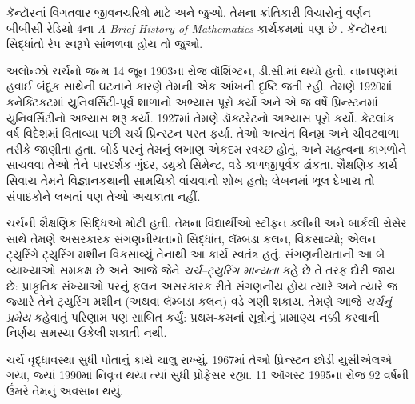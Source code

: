 \begin{reading}
કૅન્ટૉરનાં વિગતવાર જીવનચરિત્રો માટે
\citet{Dauben1990} અને
\citet{Grattan-Guinness1971} જુઓ. તેમના
ક્રાંતિકારી વિચારોનું વર્ણન બીબીસી રેડિયો 4ના
\emph{A Brief History of
  Mathematics} કાર્યક્રમમાં પણ છે
\citep{Sautoy2014}. કૅન્ટૉરના સિદ્ધાંતો
રેપ સ્વરૂપે સાંભળવા હોય તો \citet{Rose2012} જુઓ.
\end{reading}
\endgroup


\begingroup
\makeatletter{}\makeatother


\label{guunit:OLP-0623}



અલોન્ઝો ચર્ચનો જન્મ 14 જૂન 1903ના રોજ
વૉશિંગ્ટન, ડી.સી.માં થયો હતો. નાનપણમાં
હવાઈ બંદૂક સાથેની ઘટનાને કારણે તેમની
એક આંખની દૃષ્ટિ જતી રહી. તેમણે 1920માં
કનેક્ટિકટમાં યુનિવર્સિટી-પૂર્વ શાળાનો અભ્યાસ પૂરો
કર્યો અને એ જ વર્ષે પ્રિન્સ્ટનમાં
યુનિવર્સિટીનો અભ્યાસ શરૂ કર્યો. 1927માં
તેમણે ડૉક્ટરેટનો અભ્યાસ પૂરો કર્યો.
કેટલાંક વર્ષ વિદેશમાં વિતાવ્યા પછી ચર્ચ
પ્રિન્સ્ટન પરત ફર્યા. તેઓ અત્યંત વિનમ્ર
અને ચીવટવાળા તરીકે જાણીતા હતા. બોર્ડ
પરનું તેમનું લખાણ એકદમ સ્વચ્છ હોતું,
અને મહત્વના કાગળોને સાચવવા તેઓ તેને
પારદર્શક ગુંદર, ડ્યુકો સિમેન્ટ, વડે
કાળજીપૂર્વક ઢાંકતા. શૈક્ષણિક કાર્ય
સિવાય તેમને વિજ્ઞાનકથાની સામયિકો
વાંચવાનો શોખ હતો; લેખનમાં ભૂલ દેખાય
તો સંપાદકોને લખતાં પણ તેઓ અચકાતા નહીં.

ચર્ચની શૈક્ષણિક સિદ્ધિઓ મોટી હતી.
તેમના વિદ્યાર્થીઓ સ્ટીફન ક્લીની અને
બાર્કલી રોસેર સાથે તેમણે અસરકારક
સંગણનીયતાનો સિદ્ધાંત, લૅમ્બડા કલન,
વિકસાવ્યો; એલન ટ્યુરિંગે ટ્યુરિંગ
મશીન વિકસાવ્યું તેનાથી આ કાર્ય સ્વતંત્ર
હતું. સંગણનીયતાની આ બે વ્યાખ્યાઓ
સમકક્ષ છે અને આજે જેને
\emph{ચર્ચ--ટ્યુરિંગ માન્યતા} કહે છે
તે તરફ દોરી જાય છે: પ્રાકૃતિક સંખ્યાઓ
પરનું ફલન અસરકારક રીતે સંગણનીય હોય
ત્યારે અને ત્યારે જ જ્યારે તેને
ટ્યુરિંગ મશીન (અથવા લૅમ્બડા કલન)
વડે ગણી શકાય. તેમણે આજે
\emph{ચર્ચનું પ્રમેય} કહેવાતું પરિણામ
પણ સાબિત કર્યું: પ્રથમ-ક્રમનાં સૂત્રોનું
પ્રામાણ્ય નક્કી કરવાની નિર્ણય સમસ્યા
ઉકેલી શકાતી નથી.

ચર્ચે વૃદ્ધાવસ્થા સુધી પોતાનું કાર્ય
ચાલુ રાખ્યું. 1967માં તેઓ પ્રિન્સ્ટન
છોડી યુસીએલએ ગયા, જ્યાં 1990માં
નિવૃત્ત થયા ત્યાં સુધી પ્રોફેસર રહ્યા.
11 ઑગસ્ટ 1995ના રોજ 92 વર્ષની ઉંમરે
તેમનું અવસાન થયું.


